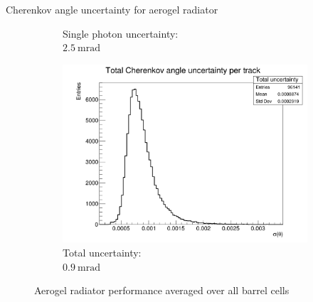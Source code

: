 \documentclass{beamer}
\begin{document}
\begin{frame}{Cherenkov angle uncertainty for aerogel radiator}
\begin{figure}
\begin{subfigure}{0.35\textwidth}
      \caption{Single photon uncertainty:\\ $\SI{2.5}{\milli\radian}$}
    \end{subfigure}%
    \begin{subfigure}{0.35\textwidth}
      \includegraphics[width = 1.0\textwidth]{Plots/TotalCherenkovUncertainty_Barrel_Aerogel.png}
      \vspace{-0.75cm}
      \caption{Total uncertainty:\\ $\SI{0.9}{\milli\radian}$}
    \end{subfigure}
    \vspace{-0.1cm}
    \caption{Aerogel radiator performance averaged over all barrel cells}
  \end{figure}
\end{frame}
\end{document}
